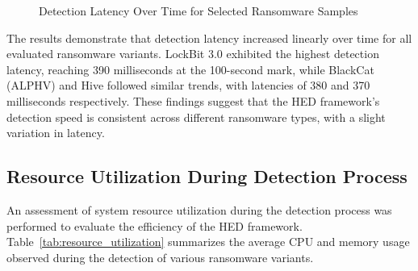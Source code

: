 \documentclass[lettersize,journal]{IEEEtran}
\begin{document}
\begin{figure}[h]
	\centering
	\caption{Detection Latency Over Time for Selected Ransomware Samples}
	\label{fig:detection_latency}
\end{figure}


The results demonstrate that detection latency increased linearly over time for all evaluated ransomware variants. LockBit 3.0 exhibited the highest detection latency, reaching 390 milliseconds at the 100-second mark, while BlackCat (ALPHV) and Hive followed similar trends, with latencies of 380 and 370 milliseconds respectively. These findings suggest that the HED framework's detection speed is consistent across different ransomware types, with a slight variation in latency.

\subsection{Resource Utilization During Detection Process}

An assessment of system resource utilization during the detection process was performed to evaluate the efficiency of the HED framework. Table~\ref{tab:resource_utilization} summarizes the average CPU and memory usage observed during the detection of various ransomware variants.
\end{document}

